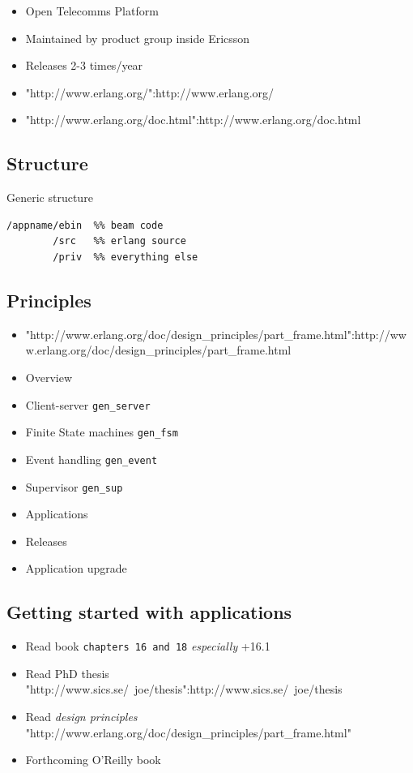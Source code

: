 \documentclass[12pt]{article}
\begin{document}
\begin{itemize}
\item Open Telecomms Platform
\item Maintained by product group inside Ericsson
\item Releases 2-3 times/year
\item "http://www.erlang.org/":http://www.erlang.org/ 
\item "http://www.erlang.org/doc.html":http://www.erlang.org/doc.html
\end{itemize}

\subsection{Structure}

Generic structure

\begin{verbatim}
/appname/ebin  %% beam code
        /src   %% erlang source
        /priv  %% everything else
\end{verbatim}

\subsection{Principles}

\begin{itemize}
\item "http://www.erlang.org/doc/design\_principles/part\_frame.html":http://www.erlang.org/doc/design\_principles/part\_frame.html
\item Overview
\item Client-server \verb+gen_server+
\item Finite State machines \verb+gen_fsm+
\item Event handling \verb+gen_event+
\item Supervisor \verb+gen_sup+
\item Applications 
\item Releases
\item Application upgrade
\end{itemize}

\subsection{Getting started with applications}

\begin{itemize}
\item Read book \verb+chapters 16 and 18+ {\sl especially} +16.1
\item Read PhD thesis "http://www.sics.se/~joe/thesis":http://www.sics.se/~joe/thesis
\item Read {\sl design principles} 
   "http://www.erlang.org/doc/design\_principles/part\_frame.html"
\item Forthcoming O'Reilly book 
\end{itemize}
\end{document}

